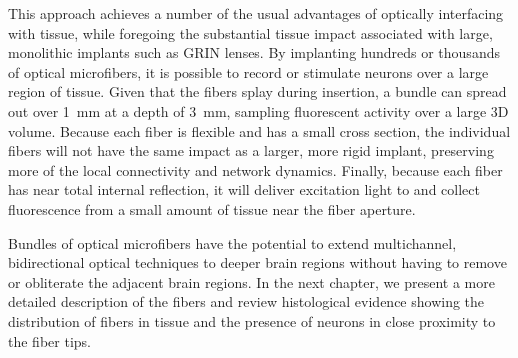 This approach achieves a number of the usual advantages 
of optically interfacing with tissue, while foregoing the 
substantial tissue impact associated with large, monolithic 
implants such as GRIN lenses. By implanting hundreds or 
thousands of optical microfibers, it is possible to record 
or stimulate neurons over a large region of tissue. Given 
that the fibers splay during insertion, a bundle can spread 
out over 1~mm at a depth of 3~mm, sampling fluorescent 
activity over a large 3D volume. Because 
each fiber is flexible and has a small cross section, the 
individual fibers will not have the same impact as a larger,
more rigid implant, preserving more of the local connectivity 
and network dynamics. Finally, because each fiber has 
near total internal reflection, it will deliver excitation 
light to and collect fluorescence from a small amount of 
tissue near the fiber aperture.

Bundles of optical microfibers have the potential to 
extend multichannel, bidirectional optical techniques to 
deeper brain regions without having to remove or obliterate 
the adjacent brain regions. In the next chapter, we 
present a more detailed description of the fibers and 
review histological evidence showing the distribution 
of fibers in tissue and the presence of neurons in close 
proximity to the fiber tips.
